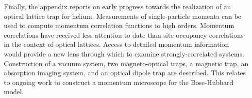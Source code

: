 Finally, the appendix reports on early progress towards the realization of an optical lattice trap for helium.
Measurements of single-particle momenta can be used to compute momentum correlation functions to high orders.
Momentum correlations have received less attention to date than site occupancy correlations in the context of optical lattices.
Access to detailed momentum information would provide a new lens through which to examine strongly-correlated systems.
Construction of a vacuum system, two magneto-optical traps, a magnetic trap, an absorption imaging system, and an optical dipole trap are described.
This relates to ongoing work to construct a momentum microscope for the Bose-Hubbard model.

